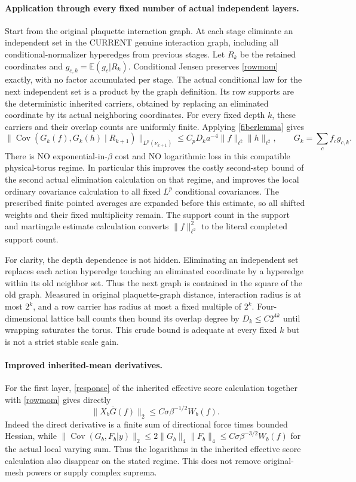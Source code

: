 \documentclass[11pt]{article}
\newcommand{\E}{\mathbb E}
\newcommand{\Cov}{\operatorname{Cov}}
\begin{document}
\paragraph{Application through every fixed number of actual independent layers.}
Start from the original plaquette interaction graph. At each stage eliminate an independent
set in the CURRENT genuine interaction graph, including all conditional-normalizer
hyperedges from previous stages. Let $R_k$ be the retained coordinates and
$g_{c,k}=\E(g_c|R_k)$. Conditional Jensen preserves \eqref{rowmom} exactly, with no
factor accumulated per stage. The actual conditional law for the next independent set
is a product by the graph definition. Its row supports are the deterministic inherited
carriers, obtained by replacing an eliminated coordinate by its actual neighboring coordinates.
For every fixed depth $k$, these carriers and their overlap counts are uniformly finite.
Applying \eqref{fiberlemma} gives
\begin{equation}\label{fixeddepth}
 \|\Cov(G_k(f),G_k(h)\mid R_{k+1})\|_{L^p(\nu_{k+1})}
 \le C_pD_k a^{-4}\|f\|_{\ell^2}\|h\|_{\ell^2},
 \qquad G_k=\sum_cf_cg_{c,k}.
\end{equation}
There is NO exponential-in-$\beta$ cost and NO logarithmic loss in this compatible
physical-torus regime. In particular this improves the costly second-step bound of the second actual elimination calculation
on that regime, and improves the local ordinary covariance calculation to all fixed $L^p$ conditional covariances.
The prescribed finite pointed averages are expanded before this estimate, so all shifted
weights and their fixed multiplicity remain. The support count in the support and martingale estimate calculation converts
$\|f\|_{\ell^2}^2$ to the literal completed support count.

For clarity, the depth dependence is not hidden. Eliminating an independent set replaces
each action hyperedge touching an eliminated coordinate by a hyperedge within its old
neighbor set. Thus the next graph is contained in the square of the old graph. Measured
in original plaquette-graph distance, interaction radius is at most $2^k$, and a row carrier
has radius at most a fixed multiple of $2^k$. Four-dimensional lattice ball counts then
bound its overlap degree by $D_k\le C2^{4k}$ until wrapping saturates the torus.
This crude bound is adequate at every fixed $k$ but is not a strict stable scale gain.

\paragraph{Improved inherited-mean derivatives.}
For the first layer, \eqref{response} of the inherited effective score calculation together with \eqref{rowmom} gives directly
\[
 \|X_b\overline G(f)\|_2\le C\sigma\beta^{-1/2}W_b(f).
\]
Indeed the direct derivative is a finite sum of directional force times bounded Hessian,
while $\|\Cov(G_b,F_b|y)\|_2\le2\|G_b\|_4\|F_b\|_4
\le C\sigma\beta^{-3/2}W_b(f)$ for the actual local varying sum.
Thus the logarithms in the inherited effective score calculation also disappear on the stated regime.
This does not remove original-mesh powers or supply complex suprema.
\end{document}
